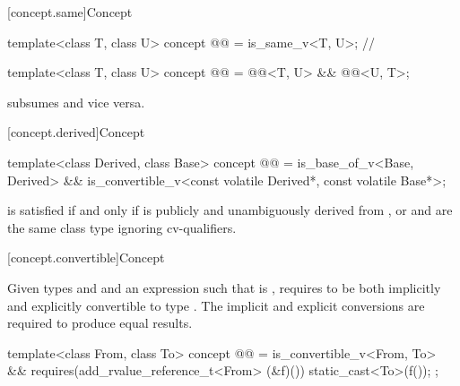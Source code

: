 [concept.same]{Concept }

\begin{itemdecl}
template<class T, class U>
  concept @@ = is_same_v<T, U>;       // \expos

template<class T, class U>
  concept @@ = @@<T, U> && @@<U, T>;
\end{itemdecl}

\begin{itemdescr}
\pnum
\begin{note}
 subsumes  and
vice versa.
\end{note}
\end{itemdescr}

[concept.derived]{Concept }

\begin{itemdecl}
template<class Derived, class Base>
  concept @@ =
    is_base_of_v<Base, Derived> &&
    is_convertible_v<const volatile Derived*, const volatile Base*>;
\end{itemdecl}

\begin{itemdescr}
\pnum
\begin{note}
 is satisfied if and only if
 is publicly and unambiguously derived from , or
 and  are the same class type ignoring cv-qualifiers.
\end{note}
\end{itemdescr}

[concept.convertible]{Concept }

\pnum
Given types  and  and
an expression  such that
 is ,
 requires 
to be both implicitly and explicitly convertible to type .
The implicit and explicit conversions are required to produce equal
results.

\begin{itemdecl}
template<class From, class To>
  concept @@ =
    is_convertible_v<From, To> &&
    requires(add_rvalue_reference_t<From> (&f)()) {
      static_cast<To>(f());
    };
\end{itemdecl}

